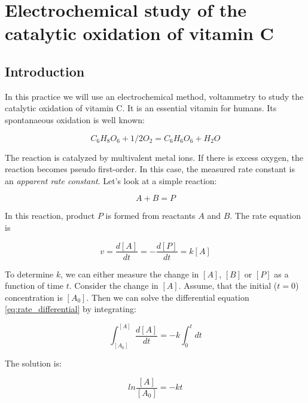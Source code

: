 \section{Electrochemical study of the catalytic oxidation of vitamin C}
\subsection{Introduction}
In this practice we will use an electrochemical method, voltammetry to study the catalytic oxidation of vitamin C. It is an essential vitamin for humans. Its spontanaeous oxidation is well known:

\begin{equation}
\label{eq:divider}
        C_6 H_8 O_6
	+
	1/2 O_2
        =
	C_6 H_6 O_6
	+ H_2O
\end{equation}

The reaction is catalyzed by multivalent metal ions. If there is excess oxygen, the reaction becomes pseudo first-order. In this case, the measured rate constant is an \emph{apparent rate constant}. Let's look at a simple reaction:

\begin{equation}
\label{eq:divider}
        A
        +
        B
        =
        P
\end{equation}

In this reaction, product $P$ is formed from reactants $A$ and $B$. The rate equation is

\begin{equation}
\label{eq:rate_differential}
	v
	=
	\frac{d[A]}{dt}
	=
	-\frac{d[P]}{dt}
	=
	k[A]
\end{equation}

To determine $k$, we can either measure the change in $[A]$, $[B]$ or $[P]$ as a function of time $t$. Consider the change in $[A]$. Assume, that the initial ($t = 0$) concentration is $[A_0]$. Then we can solve the differential equation \ref{eq:rate_differential} by integrating:

\begin{equation}
\label{eq:rate}
        \int_{[A_0]}^{[A]}
        \frac{d[A]}{dt}
        =
        -k \int_0^t
	dt
\end{equation}
 
The solution is:

\begin{equation}
\label{eq:rate}
        ln
	\frac{[A]}{[A_0]}
        =
        -kt
\end{equation}

